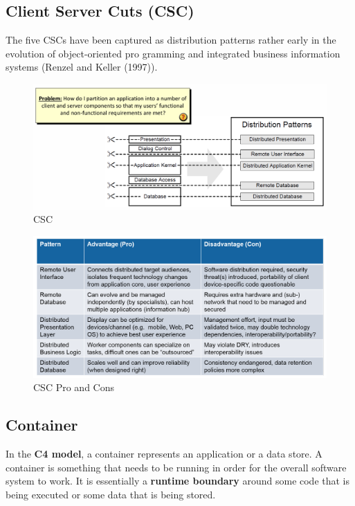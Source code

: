 \documentclass[../Main.tex]{subfiles}
\begin{document}
\subsection{Client Server Cuts (CSC)}
The five CSCs have been captured as distribution patterns 
rather early in the evolution of object-oriented pro gramming
and integrated business information systems (Renzel and Keller (1997)).
\begin{figure}[H]
    \centering
    \includegraphics[width=1\linewidth]{Images/csc.png}
    \caption{CSC}
\end{figure}

\begin{figure}[H]
    \centering
    \includegraphics[width=1\linewidth]{Images/csc-pro-con.png}
    \caption{CSC Pro and Cons}
\end{figure}

\subsection{Container}

In the \textbf{C4 model}, a container represents an application or a data store.
A container is something that needs to be running in order for the overall software system to work.
It is essentially a \textbf{runtime boundary} around some code that is
being executed or some data that is being stored.
\end{document}
